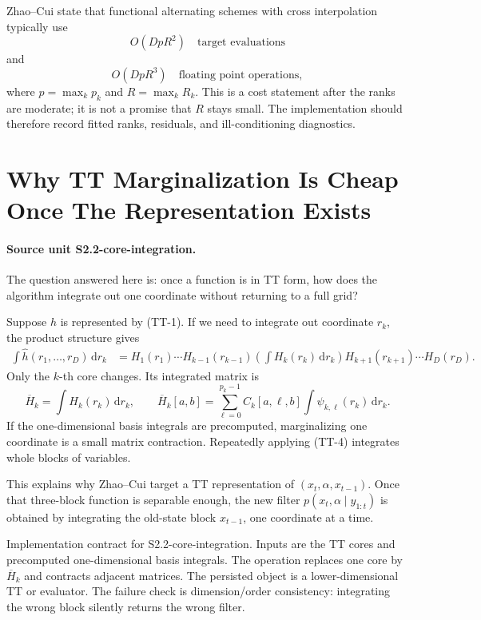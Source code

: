 \documentclass[11pt]{article}
\newcommand{\dd}{\,\mathrm d}
\begin{document}
Zhao--Cui state that functional alternating schemes with cross interpolation
typically use
\[
    O(DpR^2)\quad\text{target evaluations}
    \tag{TT-10}
\]
and
\[
    O(DpR^3)\quad\text{floating point operations},
    \tag{TT-11}
\]
where \(p=\max_k p_k\) and \(R=\max_k R_k\).  This is a cost statement after
the ranks are moderate; it is not a promise that \(R\) stays small.  The
implementation should therefore record fitted ranks, residuals, and
ill-conditioning diagnostics.

\section{Why TT Marginalization Is Cheap Once The Representation Exists}

\paragraph{Source unit S2.2-core-integration.}
The question answered here is: once a function is in TT form, how does the
algorithm integrate out one coordinate without returning to a full grid?

Suppose \(h\) is represented by (TT-1).  If we need to integrate out coordinate
\(r_k\), the product structure gives
\[
\begin{aligned}
 \int \widehat h(r_1,\ldots,r_D)\dd r_k
 &=
 H_1(r_1)\cdots H_{k-1}(r_{k-1})
 \left(\int H_k(r_k)\dd r_k\right)
 H_{k+1}(r_{k+1})\cdots H_D(r_D).
\end{aligned}
\tag{TT-4}
\]
Only the \(k\)-th core changes.  Its integrated matrix is
\[
    \overline H_k
    =
    \int H_k(r_k)\dd r_k,\qquad
    \overline H_k[a,b]
    =
    \sum_{\ell=0}^{p_k-1} C_k[a,\ell,b]
    \int \psi_{k,\ell}(r_k)\dd r_k.
    \tag{TT-5}
\]
If the one-dimensional basis integrals are precomputed, marginalizing one
coordinate is a small matrix contraction.  Repeatedly applying (TT-4) integrates
whole blocks of variables.

This explains why Zhao--Cui target a TT representation of
\((x_t,\alpha,x_{t-1})\).  Once that three-block function is separable enough,
the new filter \(p(x_t,\alpha\mid y_{1:t})\) is obtained by integrating the
old-state block \(x_{t-1}\), one coordinate at a time.

Implementation contract for S2.2-core-integration.  Inputs are the TT cores and
precomputed one-dimensional basis integrals.  The operation replaces one core
by \(\overline H_k\) and contracts adjacent matrices.  The persisted object is a
lower-dimensional TT or evaluator.  The failure check is dimension/order
consistency: integrating the wrong block silently returns the wrong filter.
\end{document}
